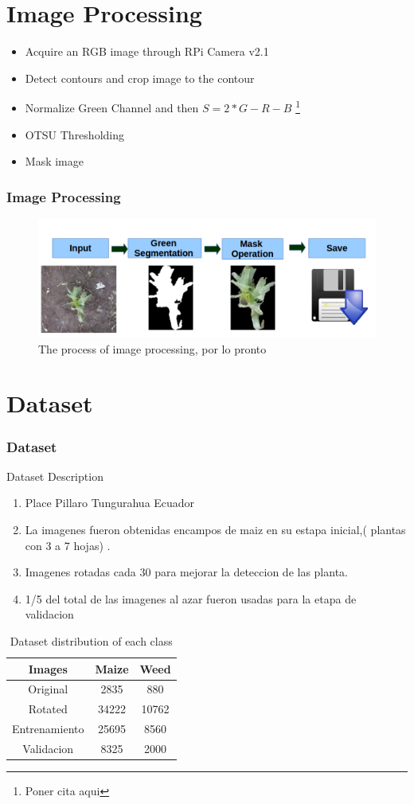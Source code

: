 \documentclass[10pt,a4paper]{beamer}
\begin{document}
\section{Image Processing}
\begin{frame}
\begin{itemize}
	\item Acquire  an RGB image through RPi Camera v2.1
	\item Detect contours and crop image to the contour
	\item Normalize Green Channel and then $S = 2*G - R - B$ \footnote{Poner cita aqui}
	\item OTSU Thresholding
	\item Mask image
\end{itemize}
\frametitle{Image Processing}
	\begin{figure}[h]
	\centering
	\includegraphics[width=3.5 in]{procesamiento}
	\caption{The process of image processing, por lo pronto}
	\label{figure4}
	\end{figure}
\end{frame}
\section{Dataset}
\begin{frame}
\frametitle{Dataset}
{Dataset Description}
\begin{enumerate}
\item Place Pillaro Tungurahua Ecuador
\item La imagenes fueron obtenidas encampos de maiz en su estapa inicial,( plantas con 3 a 7 hojas) \cite{sladojevic2016deep}.
\item Imagenes rotadas cada 30 para mejorar la deteccion de las planta.
\item 1/5 del total de las imagenes al azar fueron usadas para la etapa de validacion
\end{enumerate}
\begin{table}[h!]
\renewcommand{\arraystretch}{1.3}
\caption{Dataset distribution of each class}
\label{table:1}
\centering
\begin{tabular}{| c c c |} 
 \hline
 \textbf{Images} & \textbf{Maize} & \textbf{Weed}  \\ [1ex] 
 \hline
 Original  & 2835 & 880 \\ 
 Rotated & 34222 & 10762 \\ 
 Entrenamiento & 25695 & 8560 \\
 Validacion & 8325 & 2000 \\
 \hline
\end{tabular}
\end{table}
\end{frame}
\end{document}

